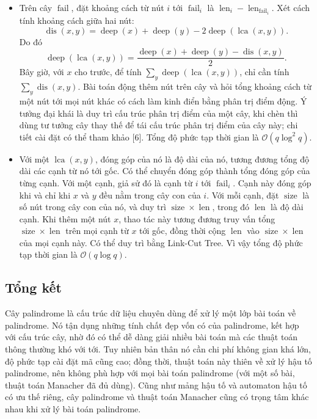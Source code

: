 \documentclass[11pt]{article}
\newcommand{\Oh}{\mathcal{O}}
\begin{document}
\begin{itemize}
  \item Trên cây \(\operatorname{fail}\), đặt khoảng cách từ nút \(i\) tới
  \(\operatorname{fail}_i\) là
  \(\operatorname{len}_i-\operatorname{len}_{\operatorname{fail}_i}\). Xét
  cách tính khoảng cách giữa hai nút:
  \[
  \operatorname{dis}(x,y)=\operatorname{deep}(x)+\operatorname{deep}(y)
  -2\operatorname{deep}(\operatorname{lca}(x,y)).
  \]
  Do đó
  \[
  \operatorname{deep}(\operatorname{lca}(x,y))=
  \frac{\operatorname{deep}(x)+\operatorname{deep}(y)-\operatorname{dis}(x,y)}
  {2}.
  \]
  Bây giờ, với \(x\) cho trước, để tính
  \(\sum_y \operatorname{deep}(\operatorname{lca}(x,y))\), chỉ cần tính
  \(\sum_y \operatorname{dis}(x,y)\). Bài toán động thêm nút trên cây và hỏi
  tổng khoảng cách từ một nút tới mọi nút khác có cách làm kinh điển bằng phân
  trị điểm động. Ý tưởng đại khái là duy trì cấu trúc phân trị điểm của một
  cây, khi chèn thì dùng tư tưởng cây thay thế để tái cấu trúc phân trị điểm
  của cây này; chi tiết cài đặt có thể tham khảo [6]. Tổng độ phức tạp thời
  gian là \(\Oh(q\log^2 q)\).

  \item Với một \(\operatorname{lca}(x,y)\), đóng góp của nó là độ dài của nó,
  tương đương tổng độ dài các cạnh từ nó tới gốc. Có thể chuyển đóng góp thành
  tổng đóng góp của từng cạnh. Với một cạnh, giả sử đó là cạnh từ \(i\) tới
  \(\operatorname{fail}_i\). Cạnh này đóng góp khi và chỉ khi \(x\) và \(y\)
  đều nằm trong cây con của \(i\). Với mỗi cạnh, đặt \(\operatorname{size}\)
  là số nút trong cây con của nó, và duy trì
  \(\operatorname{size}\times \operatorname{len}\), trong đó
  \(\operatorname{len}\) là độ dài cạnh. Khi thêm một nút \(x\), thao tác này
  tương đương truy vấn tổng \(\operatorname{size}\times \operatorname{len}\)
  trên mọi cạnh từ \(x\) tới gốc, đồng thời cộng \(\operatorname{len}\) vào
  \(\operatorname{size}\times \operatorname{len}\) của mọi cạnh này. Có thể
  duy trì bằng Link-Cut Tree. Vì vậy tổng độ phức tạp thời gian là
  \(\Oh(q\log q)\).
\end{itemize}

\subsection{Tổng kết}

Cây palindrome là cấu trúc dữ liệu chuyên dùng để xử lý một lớp bài toán về
palindrome. Nó tận dụng những tính chất đẹp vốn có của palindrome, kết hợp với
cấu trúc cây, nhờ đó có thể dễ dàng giải nhiều bài toán mà các thuật toán
thông thường khó với tới. Tuy nhiên bản thân nó cần chi phí không gian khá
lớn, độ phức tạp cài đặt mã cũng cao; đồng thời, thuật toán này thiên về xử lý
hậu tố palindrome, nên không phù hợp với mọi bài toán palindrome (với một số
bài, thuật toán Manacher đã đủ dùng). Cũng như mảng hậu tố và automaton hậu tố
có ưu thế riêng, cây palindrome và thuật toán Manacher cũng có trọng tâm khác
nhau khi xử lý bài toán palindrome.
\end{document}
